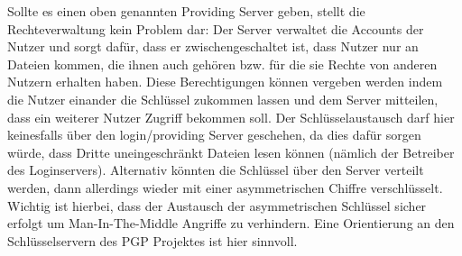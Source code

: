 \documentclass[13pt,a4paper,bibliography=totocnumbered,listof=totocnumbered]{scrartcl}
\begin{document}
Sollte es einen oben genannten Providing Server geben, stellt die Rechteverwaltung kein Problem dar: Der Server verwaltet die Accounts der Nutzer und sorgt dafür, dass er zwischengeschaltet ist, dass Nutzer nur an Dateien kommen, die ihnen auch gehören bzw. für die sie Rechte von anderen Nutzern erhalten haben. Diese Berechtigungen können vergeben werden indem die Nutzer einander die Schlüssel zukommen lassen und dem Server mitteilen, dass ein weiterer Nutzer Zugriff bekommen soll. Der Schlüsselaustausch darf hier keinesfalls über den login/providing Server geschehen, da dies dafür sorgen würde, dass Dritte uneingeschränkt Dateien lesen können (nämlich der Betreiber des Loginservers). Alternativ könnten die Schlüssel über den Server verteilt werden, dann allerdings wieder mit einer asymmetrischen Chiffre verschlüsselt. Wichtig ist hierbei, dass der Austausch der asymmetrischen Schlüssel sicher erfolgt um Man-In-The-Middle Angriffe zu verhindern. Eine Orientierung an den Schlüsselservern des PGP Projektes ist hier sinnvoll.
\end{document}
